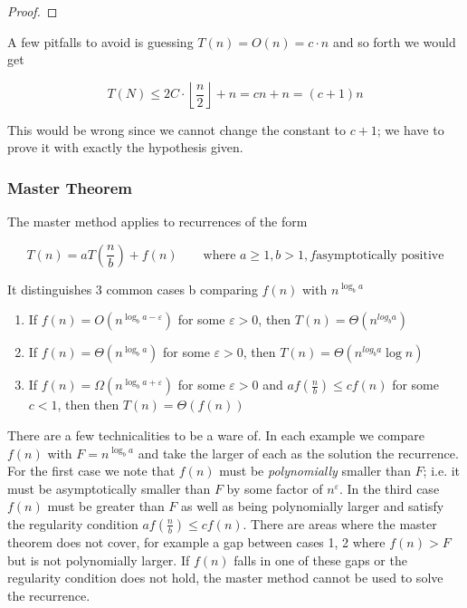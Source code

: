 \documentclass[../notes.tex]{subfiles}
\begin{document}
\begin{example}
\begin{proof}
	\end{proof}

	A few pitfalls to avoid is guessing $ T(n) = O(n) = c \cdot  n $ and so forth we would get

	\begin{equation}
		T(N) \le  2 C \cdot  \left\lfloor \frac{n}{2} \right\rfloor + n = cn+n = (c+1)n
	\end{equation}

	This would be wrong since we cannot change the constant to $ c+1 $; we have to prove it with exactly the hypothesis given.
	
\end{example}

\subsubsection{Master Theorem}

\begin{definition}
	The master method applies to recurrences of the form 

	\begin{equation}
		T(n) = a T(\frac{n}{b}) + f(n) \qquad \text{where } a \ge 1, b >  1, f  \text{asymptotically positive}
	\end{equation}

	It distinguishes 3 common cases b comparing $ f(n)  $  with $ n^{\log_ba}$ 

	\begin{enumerate}
		\item If $ f(n) = O(n^{\log_ba - \varepsilon}) $ for some $ \varepsilon > 0 $, then $ T(n) = \Theta(n^{log_ba}) $ 
		\item If $ f(n) = \Theta(n^{\log_ba }) $ for some $ \varepsilon>0 $, then $ T(n) = \Theta(n^{log_ba}\log n) $ 
		\item If $ f(n) = \Omega(n^{\log_ba + \varepsilon}) $ for some $ \varepsilon>0 $ and $ af(\frac{n}{b}) \le  c f(n) $ for some $ c < 1$, then then $ T(n) = \Theta(f(n)) $ 
	\end{enumerate}
\end{definition}


There are a few technicalities to be a ware of. 
In each example we compare $ f(n) $ with $ F = n^{\log_ba} $ and take the larger of each as the solution the recurrence. 
For the first case we note that $ f(n) $ must be \textit{polynomially} smaller than $ F $; i.e. it must be asymptotically smaller than $ F $ by some factor of $ n^\varepsilon $.
In the third case $ f(n)  $ must be greater than $ F $ as well as being polynomially larger and satisfy the regularity condition $ af(\frac{n}{b}) \le cf(n)$.
There are areas where the master theorem does not cover, for example a gap between cases 1, 2 where $ f(n) > F $ but is not polynomially larger. If $ f(n)  $ falls in one of these gaps or the regularity condition does not hold, the master method cannot be used to solve the recurrence.
\end{document}
